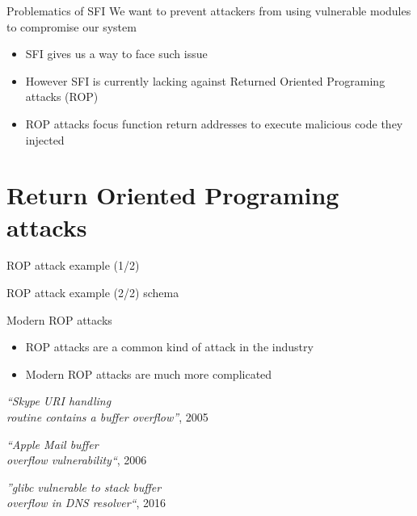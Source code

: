\documentclass{beamer}
\begin{document}
\begin{frame}[c]{Problematics of SFI}
We want to prevent attackers from using vulnerable modules to compromise our system
	\begin{itemize}
		\item SFI gives us a way to face such issue
		\item However SFI is currently lacking against Returned Oriented Programing attacks (ROP)
		\item ROP attacks focus function return addresses to execute malicious code they injected
	\end{itemize}
	
\end{frame}

\section{Return Oriented Programing attacks}
\label{sec:Return Oriented Programing attacks}


\begin{frame}{ROP attack example (1/2)}
	\Buffer
\end{frame}

\begin{frame}[c]{ROP attack example (2/2)}
 schema	
\end{frame}

\begin{frame}[c]{Modern ROP attacks}
	\begin{itemize}
		\item ROP attacks are a common kind of attack in the industry
		\item Modern ROP attacks are much more complicated 
	\end{itemize}
	\hfill \break
	\begin{center}
		\textit{``Skype URI handling\\ routine contains a buffer overflow''}, 2005\footnotemark \\
	\end{center}
	\vspace{4mm}
	\textit{``Apple Mail buffer \\overflow vulnerability``}, 2006\\
	\begin{flushright}
		\textit{''glibc vulnerable to stack buffer \\overflow in DNS resolver``}, 2016
	\end{flushright}

\end{frame}
\end{document}
